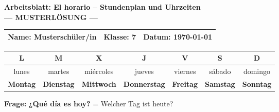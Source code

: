 \documentclass[11pt, a4paper]{article}
\newcommand{\fachfarbe}{spanisch}
\newcommand{\thema}{El horario -- Stundenplan und Uhrzeiten}
\newcommand{\klasse}{7}
\newcommand{\datum}{\today}
\newcommand{\lsg}[1]{\textcolor{loesung}{\textbf{#1}}}
\newcommand{\es}[1]{\textcolor{\fachfarbe}{\textbf{#1}}}
\begin{document}

\begin{center}
    {\Large\bfseries\textcolor{\fachfarbe}{Arbeitsblatt: \thema}}\\[0.3em]
    {\large\textcolor{loesung}{\textbf{--- MUSTERLÖSUNG ---}}}
\end{center}

\vspace{5pt}

\noindent
\begin{tabularx}{\textwidth}{|X|X|X|}
\hline
\textbf{Name:} \lsg{Musterschüler/in} &
\textbf{Klasse:} \klasse &
\textbf{Datum:} \datum \\
\hline
\end{tabularx}

\vspace{15pt}


\begin{merkkasten}
\begin{center}
\begin{tabular}{|c|c|c|c|c|c|c|}
\hline
\es{L} & \es{M} & \es{X} & \es{J} & \es{V} & \es{S} & \es{D} \\
\hline
lunes & martes & miércoles & jueves & viernes & sábado & domingo \\
\hline
\lsg{Montag} & \lsg{Dienstag} & \lsg{Mittwoch} & \lsg{Donnerstag} & \lsg{Freitag} & \lsg{Samstag} & \lsg{Sonntag} \\
\hline
\end{tabular}
\end{center}

\vspace{0.3em}
\textbf{Frage:} \es{¿Qué día es hoy?} = Welcher Tag ist heute?
\end{merkkasten}

\vspace{10pt}

\end{document}
